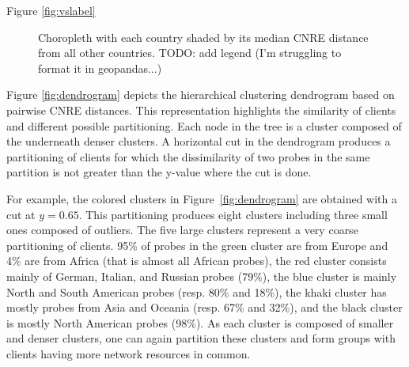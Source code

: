  Figure \ref{fig:vslabel}


\begin{figure}
    \caption{Choropleth with each country shaded by its median CNRE distance from all other countries. TODO: add legend (I'm struggling to format it in geopandas...)}
\end{figure}



Figure \ref{fig:dendrogram} depicts the hierarchical clustering dendrogram based 
on pairwise CNRE distances.
This representation highlights the similarity of clients and different possible 
partitioning.
Each node in the tree is a cluster composed of the underneath denser clusters.
A horizontal cut in the dendrogram produces a partitioning of clients  for which
the dissimilarity of two probes in the same partition is not greater than the 
y-value where the cut is done. 

For example, the colored clusters in Figure~\ref{fig:dendrogram} are obtained 
with a cut at $y=0.65$.
This partitioning produces eight clusters including three small ones 
composed of outliers.
The five large clusters represent a very coarse partitioning of clients.
95\% of probes in the green cluster are from Europe and 4\% are from Africa 
(that is almost all African probes), the red cluster consists mainly of
German, Italian, and Russian probes (79\%), the blue cluster is mainly North and
South American probes (resp. 80\% and 18\%), the khaki cluster has mostly probes
from Asia and Oceania (resp. 67\% and 32\%), and the black cluster is mostly
North American probes (98\%).
As each cluster is composed of smaller and denser clusters, one can again partition
these clusters and form groups with clients having more network resources in common.
